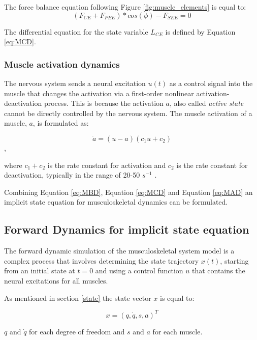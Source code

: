 The force balance equation following Figure \ref{fig:muscle_elements} is equal to:
\begin{equation}
    (F_{CE}+F_{PEE})*cos(\phi) - F_{SEE} = 0
    \label{eq:MCD}
\end{equation}

The differential equation for the state variable $L_{CE}$ is defined by Equation \ref{eq:MCD}.  
\newline
\subsubsection{Muscle activation dynamics}

The nervous system sends a neural excitation $u(t)$ as a control signal into the muscle that changes the activation via  a first-order nonlinear activation-deactivation process. This is because the activation $a$, also called \textit{active state} cannot be directly controlled by the nervous system. The  muscle activation of a muscle, $a$, is formulated as:

\begin{equation}
    \dot{a} = (u-a)(c_{1}u + c_{2})
    \label{eq:MAD}
\end{equation},

where $c_{1} + c_{2}$ is the rate constant for activation and $c_{2}$ is the rate constant for deactivation, typically in the range of 20-50 $s^{-1}$ \cite{IMP}.

Combining Equation \ref{eq:MBD}, Equation \ref{eq:MCD} and Equation \ref{eq:MAD} an implicit state equation for musculoskeletal dynamics can be formulated.  

\subsection{Forward Dynamics for implicit state equation}\label{forward}

The forward dynamic simulation of the musculoskeletal system model is a complex process that involves determining the state trajectory $x(t)$, starting from an initial state at $t = 0$ and using a control function $u$ that contains the neural excitations for all muscles. 

As mentioned in section \ref{state} the state vector $x$ is equal to:

\begin{equation}
    x = (q,\dot{q},s,a)^T
\end{equation}

$q$ and $\dot{q}$ for each degree of freedom and $s$ and $a$ for each muscle.

